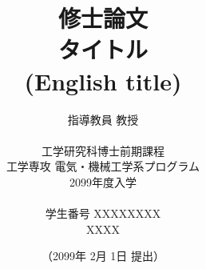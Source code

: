 \documentclass[a4j,12pt,uplatex]{ujreport}
\begin{document}
\title{
	\vspace*{-1cm}
	{\huge 修士論文}\\
	\vspace{1cm}
	{\LARGE タイトル\\
        \vspace{2mm}
        \large (English title)
    }
}
\author{
指導教員  教授\\
\hspace{30mm}
\vspace{10mm}\\
工学研究科博士前期課程\\
工学専攻 電気・機械工学系プログラム\\
2099年度入学\\
\vspace{5mm}\\
学生番号 XXXXXXXX\\
{\Large XXXX}
}
\date{（2099年  2月 1日 提出）}
\pagestyle{headings}
\maketitle

\tableofcontents
\listoffigures
\listoftables

\setcounter{page}{0}








\end{document}
